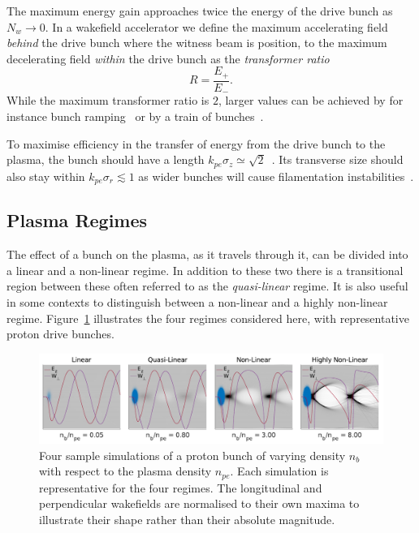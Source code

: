 The maximum energy gain approaches twice the energy of the drive bunch as $N_{w} \to 0$.
In a wakefield accelerator we define the maximum accelerating field \textit{behind} the drive bunch where the witness beam is position, to the maximum decelerating field \textit{within} the drive bunch as the \textit{transformer ratio}~\cite{muggli:2017}
\begin{equation}
    R = \frac{E_{+}}{E_{-}}. \label{EQ:TRat}
\end{equation}
While the maximum transformer ratio is $2$, larger values can be achieved by for instance bunch ramping~\cite{bane:1985} or by a train of bunches~\cite{jing:2006}.

To maximise efficiency in the transfer of energy from the drive bunch to the plasma, the bunch should have a length $k_{pe}\sigma_{z} \simeq \sqrt{2}$~\cite{lu:2005,lee:2000}.
Its transverse size should also stay within $k_{pe}\sigma_{r} \lesssim 1$ as wider bunches will cause filamentation instabilities~\cite{allen:2012,sentoku:2003}.

\subsection{Plasma Regimes}
\label{Int:BPI:Reg}

The effect of a bunch on the plasma, as it travels through it, can be divided into a linear and a non-linear regime.
In addition to these two there is a transitional region between these often referred to as the \textit{quasi-linear} regime.
It is also useful in some contexts to distinguish between a non-linear and a highly non-linear regime.
Figure~\ref{Fig:BPI:Regime} illustrates the four regimes considered here, with representative proton drive bunches.

\begin{figure}[hbt]
    \centering
    \includegraphics[width=1.0\linewidth]{figures/Regimes}
    \caption{\label{Fig:BPI:Regime}
        Four sample simulations of a proton bunch of varying density $n_{b}$ with respect to the plasma density $n_{pe}$.
        Each simulation is representative for the four regimes.
        The longitudinal and perpendicular wakefields are normalised to their own maxima to illustrate their shape rather than their absolute magnitude.
    }
\end{figure}

